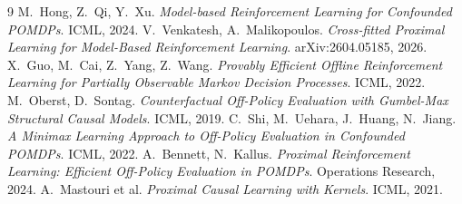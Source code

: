 \documentclass[11pt]{article}
\begin{document}
\begin{thebibliography}{9}
\small
{} M.~Hong, Z.~Qi, Y.~Xu.
\textit{Model-based Reinforcement Learning for Confounded POMDPs}. ICML, 2024.
 V.~Venkatesh, A.~Malikopoulos.
\textit{Cross-fitted Proximal Learning for Model-Based Reinforcement Learning}. arXiv:2604.05185, 2026.
 X.~Guo, M.~Cai, Z.~Yang, Z.~Wang.
\textit{Provably Efficient Offline Reinforcement Learning for Partially Observable Markov Decision Processes}.
ICML, 2022.
 M.~Oberst, D.~Sontag.
\textit{Counterfactual Off-Policy Evaluation with Gumbel-Max Structural Causal Models}. ICML, 2019.
 C.~Shi, M.~Uehara, J.~Huang, N.~Jiang.
\textit{A Minimax Learning Approach to Off-Policy Evaluation in Confounded POMDPs}. ICML, 2022.
 A.~Bennett, N.~Kallus.
\textit{Proximal Reinforcement Learning: Efficient Off-Policy Evaluation in POMDPs}.
Operations Research, 2024.
 A.~Mastouri et al.
\textit{Proximal Causal Learning with Kernels}. ICML, 2021.
\end{thebibliography}
\end{document}
